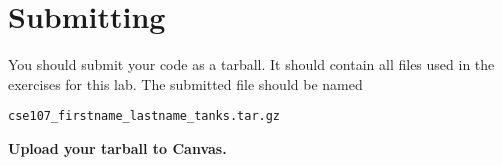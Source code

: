 \documentclass[11pt]{cselabheader}
\begin{document}
\pagebreak
\section{Submitting}
You should submit your code as a tarball. It should contain all files
used in the exercises for this lab. The submitted file should be named
\begin{center}
  \texttt{cse107\_firstname\_lastname\_tanks.tar.gz}
\end{center}

\begin{center}
  \textbf{Upload your tarball to Canvas.}
\end{center}

\listoftheorems
\end{document}
